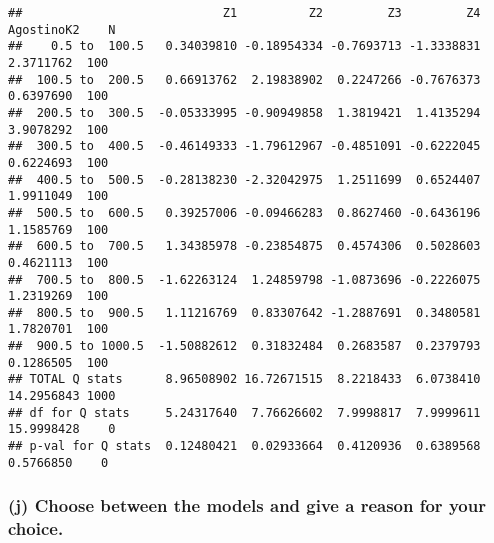 \documentclass[
]{article}
\begin{document}
\begin{verbatim}
##                            Z1          Z2         Z3         Z4 AgostinoK2    N
##    0.5 to  100.5   0.34039810 -0.18954334 -0.7693713 -1.3338831  2.3711762  100
##  100.5 to  200.5   0.66913762  2.19838902  0.2247266 -0.7676373  0.6397690  100
##  200.5 to  300.5  -0.05333995 -0.90949858  1.3819421  1.4135294  3.9078292  100
##  300.5 to  400.5  -0.46149333 -1.79612967 -0.4851091 -0.6222045  0.6224693  100
##  400.5 to  500.5  -0.28138230 -2.32042975  1.2511699  0.6524407  1.9911049  100
##  500.5 to  600.5   0.39257006 -0.09466283  0.8627460 -0.6436196  1.1585769  100
##  600.5 to  700.5   1.34385978 -0.23854875  0.4574306  0.5028603  0.4621113  100
##  700.5 to  800.5  -1.62263124  1.24859798 -1.0873696 -0.2226075  1.2319269  100
##  800.5 to  900.5   1.11216769  0.83307642 -1.2887691  0.3480581  1.7820701  100
##  900.5 to 1000.5  -1.50882612  0.31832484  0.2683587  0.2379793  0.1286505  100
## TOTAL Q stats      8.96508902 16.72671515  8.2218433  6.0738410 14.2956843 1000
## df for Q stats     5.24317640  7.76626602  7.9998817  7.9999611 15.9998428    0
## p-val for Q stats  0.12480421  0.02933664  0.4120936  0.6389568  0.5766850    0
\end{verbatim}

\hypertarget{j-choose-between-the-models-and-give-a-reason-for-your-choice.}{%
\subsubsection{(j) Choose between the models and give a reason for your
choice.}\label{j-choose-between-the-models-and-give-a-reason-for-your-choice.}}
\end{document}
